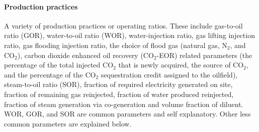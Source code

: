 \documentclass[11pt]{report}
\newcommand{\marg}[1]{{\footnotesize\textit{\textcolor{stanford}{'#1'}}}}
\newcommand{\marginnote}[1]{\marginpar{\marg{#1}}}
\begin{document}
\paragraph{Production practices} A variety of production practices or \marginnote{Inputs 1.4} operating ratios. These include gas-to-oil ratio (GOR), water-to-oil ratio (WOR), water-injection ratio, gas lifting injection ratio, gas flooding injection ratio, the choice of flood gas (natural gas, N$_2$, and CO$_2$), carbon dioxide enhanced oil recovery (CO$_2$-EOR) related parameters (the percentage of the total injected CO$_2$ that is newly acquired, the source of CO$_2$, and the percentage of the CO$_2$ sequestration credit assigned to the oilfield), steam-to-oil ratio (SOR), fraction of required electricity generated on site, fraction of remaining gas reinjected, fraction of water produced reinjected, fraction of steam generation via co-generation and volume fraction of diluent. WOR, GOR, and SOR are common parameters and self explanatory. Other less common parameters are explained below.
\end{document}
